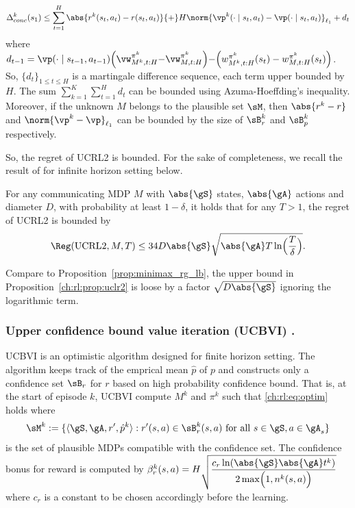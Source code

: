 \begin{equation}
    \label{ch:rl:eq:delta_conc}
    \Delta_{conc}^k(s_1)\le\sum_{t=1}^{H} \abs{r^k(s_t,a_t)-r(s_t,a_t)}{+}H\norm{\vp^k(\cdot\mid s_t,a_t)-\vp(\cdot\mid s_t,a_t)}_{\ell_1} +d_t
\end{equation}
where $d_{t-1}=\vp(\cdot\mid s_{t{-}1},a_{t{-}1})\Bigl(\vw^{\pi^k}_{M^k,t:H} {-}\vw^{\pi^k}_{M,t:H}\Bigr) {-}\Bigl(w^{\pi^k}_{M^k,t:H}(s_{t}) -w^{\pi^k}_{M,t:H}(s_{t})\Bigr)$.
So, $\{d_t\}_{1\le t\le H}$ is a martingale difference sequence, each term upper bounded by $H$.
The sum $\sum_{k=1}^K\sum_{t=1}^Hd_t$ can be bounded using Azuma-Hoeffding's inequality.
Moreover, if the unknown $M$ belongs to the plausible set $\sM$, then $\abs{r^k-r}$ and $\norm{\vp^k-\vp}_{\ell_1}$ can be bounded by the size of $\sB_r^k$ and $\sB_p^k$ respectively.

So, the regret of UCRL2 is bounded.
For the sake of completeness, we recall the result of \cite{jaksch2010near} for infinite horizon setting below.
\begin{prop}
    \label{ch:rl:prop:uclr2}
    For any communicating MDP $M$ with $\abs{\gS}$ states, $\abs{\gA}$ actions and diameter $D$, with probability at least $1-\delta$, it holds that for any $T>1$, the regret of UCRL2 is bounded by
    \begin{align*}
        \Reg(\mathrm{UCRL2}, M, T) \le 34D\abs{\gS}\sqrt{\abs{\gA}T\ln\Bigl(\frac{T}{\delta}\Bigr)}.
    \end{align*}
\end{prop}
Compare to Proposition~\ref{prop:minimax_rg_lb}, the upper bound in Proposition~\ref{ch:rl:prop:uclr2} is loose by a factor $\sqrt{D\abs{\gS}}$ ignoring the logarithmic term.

\subsubsection{Upper confidence bound value iteration (UCBVI) \texorpdfstring{\cite{azar2017minimax}}{[AOM17]}.}
UCBVI is an optimistic algorithm designed for finite horizon setting.
The algorithm keeps track of the emprical mean $\hat{p}$ of $p$ and constructs only a confidence set $\sB_r$ for $r$ based on high probability confidence bound.
That is, at the start of episode $k$, UCBVI compute $M^k$ and $\pi^k$ such that \eqref{ch:rl:eq:optim} holds where
\begin{align*}
    \sM^k:=\{\langle\gS,\gA,r',\hat{p}^k\rangle : r'(s,a)\in\sB_r^k(s,a) \text{ for all }s\in\gS, a\in\gA_s\}
\end{align*}
is the set of plausible MDPs compatible with the confidence set.
The confidence bonus for reward is computed by $\beta_r^k(s,a)=\displaystyle H\sqrt{\frac{c_r\ln(\abs{\gS}\abs{\gA}t^k)}{2\max\Bigl(1,n^k(s,a)\Bigr)}}$ where $c_r$ is a constant to be chosen accordingly before the learning.

